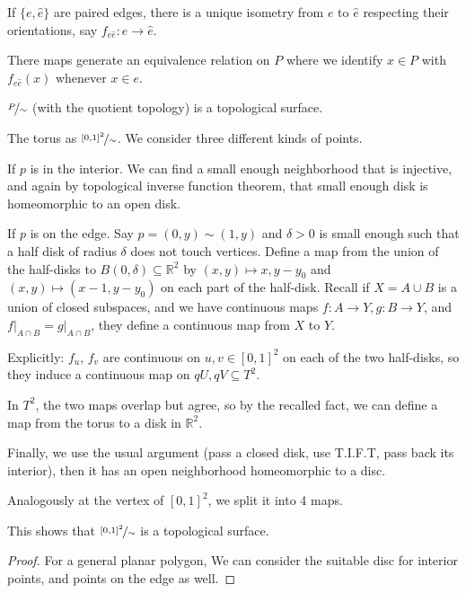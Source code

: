 \begin{enumerate}
    If \(\{e, \hat{e}\}\) are paired edges, there is a unique isometry from \(e\) to \(\hat{e} \) respecting their orientations, say \(f_{e\hat{e}}: e \to \hat{e} \).

    There maps generate an equivalence relation on \(P\) where we identify \(x \in P\) with \(f_{e \hat{e} }(x)\) whenever \(x \in e\).
    \begin{lemma}{}{}
        \(\nicefrac{P}{\sim}\) (with the quotient topology) is a topological surface.
    \end{lemma}
    \begin{example}
        The torus as \(\nicefrac{[0,1]^2}{\sim}\). We consider three different kinds of points.

        If \(p\) is in the interior. We can find a small enough neighborhood that is injective, and again by topological inverse function theorem, that small enough disk is homeomorphic to an open disk.

        If \(p\) is on the edge. Say \(p = (0,y) \sim (1,y)\) and \(\delta >0\) is small enough such that a half disk of radius \(\delta\) does not touch vertices. Define a map from the union of the half-disks to \(B(0,\delta) \subseteq \mathbb{R}^2\) by \((x,y) \mapsto x, y - y_0\) and \((x,y)\mapsto (x-1,y-y_0)\) on each part of the half-disk. Recall if \(X = A \cup B\) is a union of closed subspaces, and we have continuous maps \(f: A\to Y, g: B\to Y\), and \(\left.f\right|_{A\cap B} = \left.g\right|_{A\cap B}\), they define a continuous map from \(X\) to \(Y\).

        Explicitly: \(f_u\), \(f_v\) are continuous on \(u,v \in [0,1]^2\) on each of the two half-disks, so they induce a continuous map on \(qU, qV \subseteq T^2\).

        In \(T^2\), the two maps overlap but agree, so by the recalled fact, we can define a map from the torus to a disk in \(\mathbb{R}^2\).

        Finally, we use the usual argument (pass a closed disk, use T.I.F.T, pass back its interior), then it has an open neighborhood homeomorphic to a disc.

        Analogously at the vertex of \([0,1]^2\), we split it into 4 maps.
        
        This shows that \(\nicefrac{[0,1]^2}{\sim}\) is a topological surface.
    \end{example}
    \begin{proof}
        For a general planar polygon, We can consider the suitable disc for interior points, and points on the edge as well.


\end{proof}
\end{enumerate}
